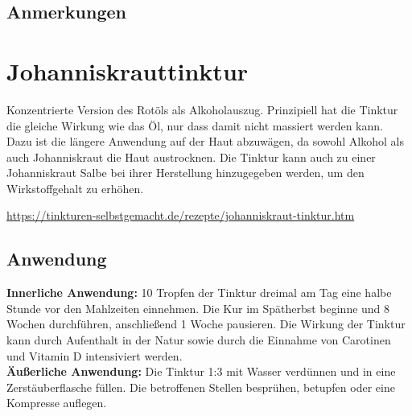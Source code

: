 \subsection{Anmerkungen}



\newpage



\section{Johanniskrauttinktur}

Konzentrierte Version des Rotöls als Alkoholauszug. Prinzipiell hat die Tinktur die gleiche Wirkung wie das Öl, nur dass damit nicht massiert werden kann. Dazu ist die längere Anwendung auf der Haut abzuwägen, da sowohl Alkohol als auch Johanniskraut die Haut austrocknen. Die Tinktur kann auch zu einer Johanniskraut Salbe bei ihrer Herstellung hinzugegeben werden, um den Wirkstoffgehalt zu erhöhen.

\cite{tinkturen} \cite{nedoma2018heiltinkturen}

\url{https://tinkturen-selbstgemacht.de/rezepte/johanniskraut-tinktur.htm}

     
               

\subsection{Anwendung}

\textbf{Innerliche Anwendung:} 10 Tropfen der Tinktur dreimal am Tag eine halbe Stunde vor den Mahlzeiten einnehmen. Die Kur im Spätherbst beginne und 8 Wochen durchführen, anschließend 1 Woche pausieren. Die Wirkung der Tinktur kann durch Aufenthalt in der Natur sowie durch die Einnahme von Carotinen und Vitamin D intensiviert werden.\\

\textbf{Äußerliche Anwendung:} Die Tinktur 1:3 mit Wasser verdünnen und in eine Zerstäuberflasche füllen. Die betroffenen Stellen besprühen, betupfen oder eine Kompresse auflegen.\\


